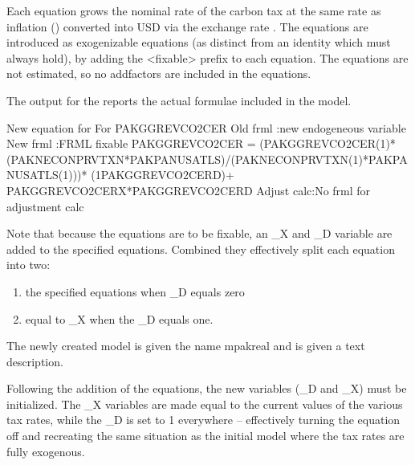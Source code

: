 \documentclass[letterpaper,10pt,english]{jupyterBook}
\begin{document}
\sphinxAtStartPar
Each equation grows the nominal rate of the carbon tax at the same rate as inflation () converted into USD via the exchange rate . The equations are introduced as exogenizable equations (as distinct from an identity which must always hold), by adding the <fixable> prefix to each equation. The equations are not estimated, so no add\sphinxhyphen{}factors are included in the equations.

\sphinxAtStartPar
The output for the  reports the actual formulae included in the model.

\begin{sphinxVerbatim}[commandchars=\\\{\}]
New equation for For PAKGGREVCO2CER
Old frml   :new endogeneous variable 
New frml   :FRML \PYGZlt{}fixable\PYGZgt{} PAKGGREVCO2CER = (PAKGGREVCO2CER(\PYGZhy{}1)*(PAKNECONPRVTXN*PAKPANUSATLS)/(PAKNECONPRVTXN(\PYGZhy{}1)*PAKPANUSATLS(\PYGZhy{}1)))* (1\PYGZhy{}PAKGGREVCO2CER\PYGZus{}D)+ PAKGGREVCO2CER\PYGZus{}X*PAKGGREVCO2CER\PYGZus{}D\PYGZdl{}
Adjust calc:No frml for adjustment calc 
\end{sphinxVerbatim}

\sphinxAtStartPar
Note that because the equations are to be fixable, an \_X and \_D variable are added to the specified equations. Combined they effectively split each equation into  two:
\begin{enumerate}
%
\item {} 
\sphinxAtStartPar
the specified equations when \_D equals zero

\item {} 
\sphinxAtStartPar
equal to \_X when the \_D equals one.

\end{enumerate}

\sphinxAtStartPar
The newly created model is given the name mpakreal and is given a text description.

\sphinxAtStartPar
Following the addition of the equations, the new variables (\_D and \_X) must be initialized. The \_X variables are made equal to the current values of the various tax rates, while the \_D is set to 1 everywhere – effectively turning the equation off and re\sphinxhyphen{}creating the same situation as the initial model where the tax rates are fully exogenous.
\end{document}
